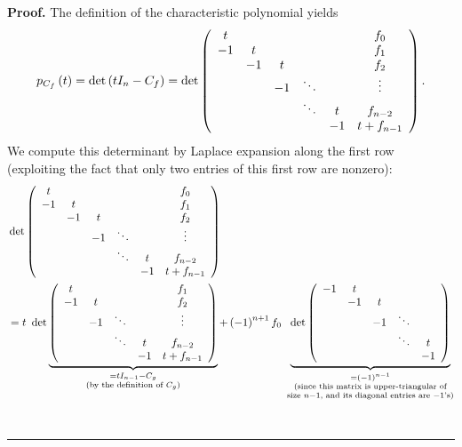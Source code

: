 \documentclass[numbers=enddot,12pt,final,onecolumn,notitlepage]{scrartcl}%
\numberwithin{exer}{subsection}
\theoremstyle{definition}
\newenvironment{proof}[1][Proof]{\noindent\textbf{#1.} }{\ \rule{0.5em}{0.5em}}
\begin{document}
\begin{proof}
The definition of the characteristic polynomial yields%
\[
p_{C_{f}}\left(  t\right)  =\det\left(  tI_{n}-C_{f}\right)  =\det\left(
\begin{array}
[c]{cccccc}%
t &  &  &  &  & f_{0}\\
-1 & t &  &  &  & f_{1}\\
& -1 & t &  &  & f_{2}\\
&  & -1 & \ddots &  & \vdots\\
&  &  & \ddots & t & f_{n-2}\\
&  &  &  & -1 & t+f_{n-1}%
\end{array}
\right)  .
\]
We compute this determinant by Laplace expansion along the first row
(exploiting the fact that only two entries of this first row are nonzero):%
\begin{align*}
&  \det\left(
\begin{array}
[c]{cccccc}%
t &  &  &  &  & f_{0}\\
-1 & t &  &  &  & f_{1}\\
& -1 & t &  &  & f_{2}\\
&  & -1 & \ddots &  & \vdots\\
&  &  & \ddots & t & f_{n-2}\\
&  &  &  & -1 & t+f_{n-1}%
\end{array}
\right) \\
&  =t\ \det\underbrace{\left(
\begin{array}
[c]{ccccc}%
t &  &  &  & f_{1}\\
-1 & t &  &  & f_{2}\\
& -1 & \ddots &  & \vdots\\
&  & \ddots & t & f_{n-2}\\
&  &  & -1 & t+f_{n-1}%
\end{array}
\right)  }_{\substack{=tI_{n-1}-C_{g}\\\text{(by the definition of }%
C_{g}\text{)}}}+\left(  -1\right)  ^{n+1}f_{0}\ \underbrace{\det\left(
\begin{array}
[c]{ccccc}%
-1 & t &  &  & \\
& -1 & t &  & \\
&  & -1 & \ddots & \\
&  &  & \ddots & t\\
&  &  &  & -1
\end{array}
\right)  }_{\substack{=\left(  -1\right)  ^{n-1}\\\text{(since this matrix is
upper-triangular of}\\\text{size }n-1\text{, and its diagonal entries are
}-1\text{'s)}}}\\

\end{align*}
\end{proof}
\end{document}
